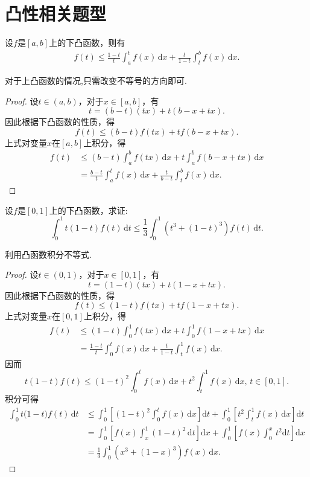 \documentclass[../../main.tex]{subfiles}
\begin{document}
\section{凸性相关题型}

\begin{proposition}\label{proposition:凸性积分不等式}
设\( f \)是\([a,b]\)上的下凸函数，则有
\begin{align*}
f(t) \leqslant \frac{1-t}{t} \int_a^t f(x)\,\text{d}x + \frac{t}{1-t}\int_t^b f(x)\,\text{d}x.
\end{align*}
\end{proposition}
\begin{note}
对于上凸函数的情况,只需改变不等号的方向即可.
\end{note}
\begin{proof}
设\( t \in (a,b) \)，对于\( x \in [a,b] \)，有
\[
t = (b-t)(tx) + t(b - x + tx).
\]
因此根据下凸函数的性质，得
\[
f(t) \leqslant (b-t)f(tx) + tf(b - x + tx).
\]
上式对变量\( x \)在\([a,b]\)上积分，得
\begin{align*}
f(t) &\leqslant (b-t)\int_a^b f(tx)\,\text{d}x + t\int_a^b f(b - x + tx)\,\text{d}x \\
&= \frac{b-t}{t} \int_a^t f(x)\,\text{d}x + \frac{t}{b-t}\int_t^b f(x)\,\text{d}x.
\end{align*}
\end{proof}

\begin{example}
设\( f \)是\([0,1]\)上的下凸函数，求证:
\[
\int_0^1 t(1-t)f(t)\,\text{d}t \leq \frac{1}{3}\int_0^1 \left(t^3 + (1-t)^3\right)f(t)\,\text{d}t.
\]
\end{example}
\begin{note}
利用凸函数积分不等式.
\end{note}
\begin{proof}
设\( t \in (0,1) \)，对于\( x \in [0,1] \)，有
\[
t = (1-t)(tx) + t(1 - x + tx).
\]
因此根据下凸函数的性质，得
\[
f(t) \leq (1-t)f(tx) + tf(1 - x + tx).
\]
上式对变量\( x \)在\([0,1]\)上积分，得
\begin{align*}
f(t) &\leq (1-t)\int_0^1 f(tx)\,\text{d}x + t\int_0^1 f(1 - x + tx)\,\text{d}x \\
&= \frac{1-t}{t} \int_0^t f(x)\,\text{d}x + \frac{t}{1-t}\int_t^1 f(x)\,\text{d}x.
\end{align*}
因而
\[
t(1-t)f(t) \leq (1-t)^2\int_0^t f(x)\,\text{d}x + t^2\int_t^1 f(x)\,\text{d}x, \, t \in [0,1].
\]
积分可得
\begin{align*}
\int_0^1{t(1}-t)f(t)\,\mathrm{d}t&\leqslant \int_0^1{\left[ (1-t)^2\int_0^t{f(x)\,\mathrm{d}x} \right] \mathrm{d}t}+\int_0^1{\left[ t^2\int_t^1{f(x)\,\mathrm{d}x} \right] \mathrm{d}t}
\\
&=\int_0^1{\left[ f\left( x \right) \int_x^1{(1-t)^2\,\mathrm{d}t} \right] \mathrm{d}x}+\int_0^1{\left[ f(x)\int_0^x{\,t^2\mathrm{d}t} \right] \mathrm{d}x}
\\
&=\frac{1}{3}\int_0^1{\left( x^3+(1-x)^3 \right) f(x)\,\mathrm{d}x}.
\end{align*}
\end{proof}
\end{document}
